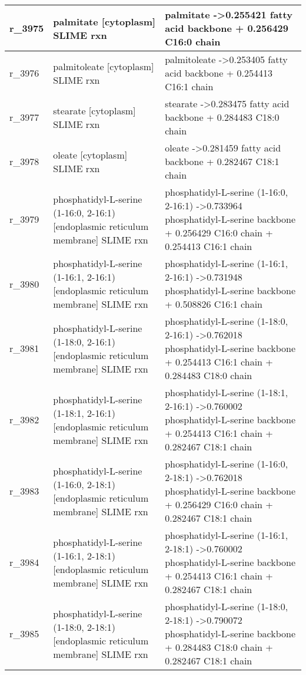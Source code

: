 \begin{landscape}
{\begin{longtable}{|l|p{7cm}|p{15cm}|}
r\_3975 & palmitate {[}cytoplasm{]} SLIME rxn & palmitate  -\textgreater 0.255421 fatty acid backbone + 0.256429 C16:0 chain \\ \hline
r\_3976 & palmitoleate {[}cytoplasm{]} SLIME rxn & palmitoleate  -\textgreater 0.253405 fatty acid backbone + 0.254413 C16:1 chain \\ \hline
r\_3977 & stearate {[}cytoplasm{]} SLIME rxn & stearate  -\textgreater 0.283475 fatty acid backbone + 0.284483 C18:0 chain \\ \hline
r\_3978 & oleate {[}cytoplasm{]} SLIME rxn & oleate  -\textgreater 0.281459 fatty acid backbone + 0.282467 C18:1 chain \\ \hline
r\_3979 & phosphatidyl-L-serine (1-16:0, 2-16:1) {[}endoplasmic reticulum membrane{]} SLIME rxn & phosphatidyl-L-serine (1-16:0, 2-16:1)  -\textgreater 0.733964 phosphatidyl-L-serine backbone + 0.256429 C16:0 chain + 0.254413 C16:1 chain \\ \hline
r\_3980 & phosphatidyl-L-serine (1-16:1, 2-16:1) {[}endoplasmic reticulum membrane{]} SLIME rxn & phosphatidyl-L-serine (1-16:1, 2-16:1)  -\textgreater 0.731948 phosphatidyl-L-serine backbone + 0.508826 C16:1 chain \\ \hline
r\_3981 & phosphatidyl-L-serine (1-18:0, 2-16:1) {[}endoplasmic reticulum membrane{]} SLIME rxn & phosphatidyl-L-serine (1-18:0, 2-16:1)  -\textgreater 0.762018 phosphatidyl-L-serine backbone + 0.254413 C16:1 chain + 0.284483 C18:0 chain \\ \hline
r\_3982 & phosphatidyl-L-serine (1-18:1, 2-16:1) {[}endoplasmic reticulum membrane{]} SLIME rxn & phosphatidyl-L-serine (1-18:1, 2-16:1)  -\textgreater 0.760002 phosphatidyl-L-serine backbone + 0.254413 C16:1 chain + 0.282467 C18:1 chain \\ \hline
r\_3983 & phosphatidyl-L-serine (1-16:0, 2-18:1) {[}endoplasmic reticulum membrane{]} SLIME rxn & phosphatidyl-L-serine (1-16:0, 2-18:1)  -\textgreater 0.762018 phosphatidyl-L-serine backbone + 0.256429 C16:0 chain + 0.282467 C18:1 chain \\ \hline
r\_3984 & phosphatidyl-L-serine (1-16:1, 2-18:1) {[}endoplasmic reticulum membrane{]} SLIME rxn & phosphatidyl-L-serine (1-16:1, 2-18:1)  -\textgreater 0.760002 phosphatidyl-L-serine backbone + 0.254413 C16:1 chain + 0.282467 C18:1 chain \\ \hline
r\_3985 & phosphatidyl-L-serine (1-18:0, 2-18:1) {[}endoplasmic reticulum membrane{]} SLIME rxn & phosphatidyl-L-serine (1-18:0, 2-18:1)  -\textgreater 0.790072 phosphatidyl-L-serine backbone + 0.284483 C18:0 chain + 0.282467 C18:1 chain \\ \hline

\end{longtable}}
\end{landscape}
